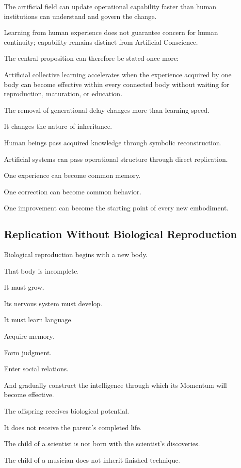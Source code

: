 The artificial field can update operational capability faster than human institutions can understand and govern the change.

Learning from human experience does not guarantee concern for human continuity; capability remains distinct from Artificial Conscience.

The central proposition can therefore be stated once more:

Artificial collective learning accelerates when the experience acquired by one body can become effective within every connected body without waiting for reproduction, maturation, or education.

The removal of generational delay changes more than learning speed.

It changes the nature of inheritance.

Human beings pass acquired knowledge through symbolic reconstruction.

Artificial systems can pass operational structure through direct replication.

One experience can become common memory.

One correction can become common behavior.

One improvement can become the starting point of every new embodiment.

\subsection*{\textbf{Replication Without Biological Reproduction}} 

Biological reproduction begins with a new body.

That body is incomplete.

It must grow.

Its nervous system must develop.

It must learn language.

Acquire memory.

Form judgment.

Enter social relations.

And gradually construct the intelligence through which its Momentum will become effective.

The offspring receives biological potential.

It does not receive the parent’s completed life.

The child of a scientist is not born with the scientist’s discoveries.

The child of a musician does not inherit finished technique.

